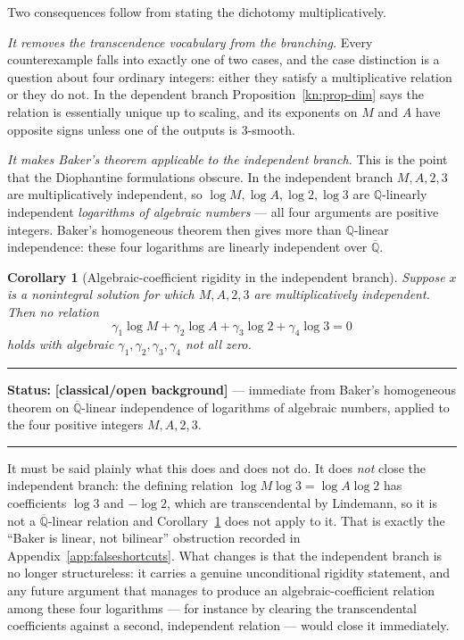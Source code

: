\documentclass[11pt,oneside]{article}
\newtheorem{corollary}[theorem]{Corollary}
\theoremstyle{definition}
\theoremstyle{remark}
\newcommand{\Q}{\mathbb Q}
\newcommand{\Abar}{\overline{\mathbb Q}}
\newcommand{\Qbar}{\Abar}
\newcommand{\statusknown}{\textcolor{classicalgray}{\textbf{[classical/open background]}}}
\newenvironment{statusbox}[1]
{\begin{center}\begin{minipage}{0.94\textwidth}\raggedright\hbadness=10000\hrule
\vspace{0.45em}\textbf{Status:} #1\par\vspace{0.35em}}
{\vspace{0.35em}\hrule\end{minipage}\end{center}}
\begin{document}
Two consequences follow from stating the dichotomy multiplicatively.

\emph{It removes the transcendence vocabulary from the branching.}  Every counterexample
falls into exactly one of two cases, and the case distinction is a question about four
ordinary integers: either they satisfy a multiplicative relation or they do not.  In the
dependent branch Proposition~\ref{kn:prop-dim} says the relation is essentially unique up to
scaling, and its exponents on $M$ and $A$ have opposite signs unless one of the outputs is
$3$-smooth.

\emph{It makes Baker's theorem applicable to the independent branch.}  This is the point that
the Diophantine formulations obscure.  In the independent branch $M,A,2,3$ are
multiplicatively independent, so $\log M,\log A,\log2,\log3$ are $\Q$-linearly independent
\emph{logarithms of algebraic numbers} --- all four arguments are positive integers.  Baker's
homogeneous theorem then gives more than $\Q$-linear independence: these four logarithms are
linearly independent over $\Qbar$.

\begin{corollary}[Algebraic-coefficient rigidity in the independent branch]
\label{kn:cor-baker}
Suppose $x$ is a nonintegral solution for which $M,A,2,3$ are multiplicatively independent.
Then no relation
\[
  \gamma_1\log M+\gamma_2\log A+\gamma_3\log2+\gamma_4\log3=0
\]
holds with algebraic $\gamma_1,\gamma_2,\gamma_3,\gamma_4$ not all zero.
\end{corollary}

\begin{statusbox}{\statusknown{} --- immediate from Baker's homogeneous theorem on
$\Qbar$-linear independence of logarithms of algebraic numbers, applied to the four positive
integers $M,A,2,3$.}
\end{statusbox}

It must be said plainly what this does and does not do.  It does \emph{not} close the
independent branch: the defining relation $\log M\log3=\log A\log2$ has coefficients $\log3$
and $-\log2$, which are transcendental by Lindemann, so it is not a $\Qbar$-linear relation
and Corollary~\ref{kn:cor-baker} does not apply to it.  That is exactly the ``Baker is linear,
not bilinear'' obstruction recorded in Appendix~\ref{app:falseshortcuts}.  What changes is
that the independent branch is no longer structureless: it carries a genuine unconditional
rigidity statement, and any future argument that manages to produce an algebraic-coefficient
relation among these four logarithms --- for instance by clearing the transcendental
coefficients against a second, independent relation --- would close it immediately.
\end{document}
